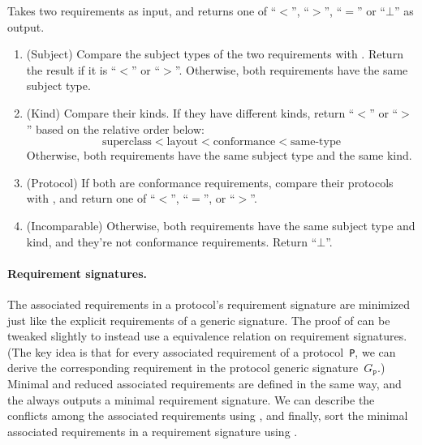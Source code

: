 \documentclass[../generics]{subfiles}
\begin{document}
\begin{algorithm}\label{requirement order}
 Takes two requirements as input, and returns one of ``$<$'', ``$>$'', ``$=$'' or \index{$\bot$}``$\bot$'' as output.
\begin{enumerate}
\item (Subject) Compare the subject types of the two requirements with . Return the result if it is ``$<$'' or ``$>$''. Otherwise, both requirements have the same subject type.
\item (Kind)  Compare their kinds. If they have different kinds, return ``$<$'' or ``$>$'' based on the relative order below:
\[\text{superclass} < \text{layout} < \text{conformance} < \text{same-type}\]
Otherwise, both requirements have the same subject type and the same kind. 
\item (Protocol) If both are conformance requirements, compare their protocols with , and return one of ``$<$'', ``$=$'', or ``$>$''.
\item (Incomparable) Otherwise, both requirements have the same subject type and kind, and they're not conformance requirements. Return ``$\bot$''.
\end{enumerate}
\end{algorithm}

\paragraph{Requirement signatures.} The associated requirements in a protocol's requirement signature are minimized just like the explicit requirements of a generic signature. The proof of  can be tweaked slightly to instead use a equivalence relation on requirement signatures. (The key idea is that for every associated requirement of a protocol~\texttt{P}, we can derive the corresponding requirement in the protocol generic signature~$G_\texttt{P}$.) Minimal and reduced associated requirements are defined in the same way, and the  always outputs a minimal requirement signature. We can describe the conflicts among the associated requirements using , and finally, sort the minimal associated requirements in a requirement signature using .
\end{document}
